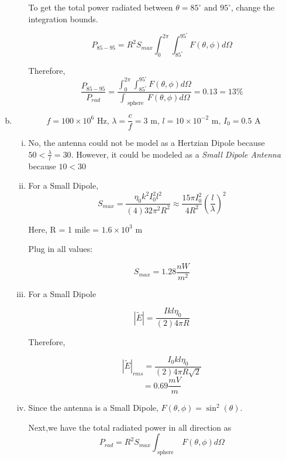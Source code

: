 \documentclass{article} %
\begin{document}
\begin{enumerate}[(a)]
\begin{enumerate}[(i)]
                        To get the total power radiated between $\theta = 85^{\circ} \text{ and } 95^{\circ}$, change the integration bounds.

                        \[P_{85-95} = R^2 S_{max}\int_{0}^{2\pi} \int_{85^{\circ}}^{95^{\circ}}  F(\theta, \phi) d\Omega\]

                        Therefore,
                        \[\frac{P_{85-95}}{P_{rad}} = \frac{\int_{0}^{2\pi} \int_{85^{\circ}}^{95^{\circ}}  F(\theta, \phi) d\Omega}{\int_{\text{ sphere }}  F(\theta, \phi) d\Omega} = 0.13 = \boxed{13 \%}\]
            \end{enumerate}
      \item
            \[f = 100 \times 10^6 \text{ Hz, } \lambda = \frac{c}{f} = 3 \text{ m, } l = 10 \times 10^{-2} \text{ m, } I_0 = 0.5 \text{ A }\]
            \begin{enumerate}[(i)]
                  \item $\boxed{\text{No}}$, the antenna could not be model as a Hertzian Dipole because $50 < \frac{\lambda}{l} = 30$. However, it could be modeled as a \textit{Small Dipole Antenna} because $10 < 30$
                  \item For a Small Dipole,
                        \[S_{max} = \frac{\eta_0 k^2 I_0 ^2 l^2}{(4)32 \pi^2 R^2} \approx \frac{15 \pi I_0 ^2}{4R^2}\left(\frac{l}{\lambda}\right)^2\]

                        Here, R = 1 mile = $1.6 \times 10^3 \text{ m}$

                        Plug in all values:

                        \[\boxed{S_{max} = 1.28 \si{\frac{nW}{m^2}}}\]
                  \item
                        For a Small Dipole

                        \[|\widetilde{E}| = \frac{I k l \eta_0}{(2)4 \pi R}\]

                        Therefore,

                        \[|\widetilde{E}|_{rms} = \frac{I_0 k l \eta_0}{(2)4 \pi R \sqrt{2}}\]
                        \[= \boxed{0.69 \si{\frac{mV}{m}}}\]
                  \item
                        Since the antenna is a Small Dipole, $F(\theta, \phi) = \sin^2(\theta)$.

                        Next,we have the total radiated power in all direction as
                        \[P_{rad} = R^2 S_{max}\int_{\text{ sphere }}  F(\theta, \phi) d\Omega\]


\end{enumerate}
\end{enumerate}
\end{document}

